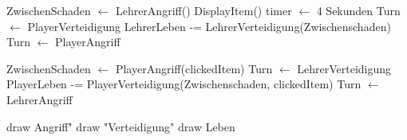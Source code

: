\begin{frame}
	\begin{algorithm}[H]
		\begin{algorithmic}[1]
				\State ZwischenSchaden $\gets$ LehrerAngriff()
					\State DisplayItem()
				\EndIf
				\State timer $\gets$ 4 Sekunden
				\State Turn $\gets$ PlayerVerteidigung
				\State LehrerLeben -= LehrerVerteidigung(Zwischenschaden)
				\State Turn $\gets$ PlayerAngriff
			\EndIf
		\end{algorithmic}
		\caption{LehrerObject.update() pseudocode}
		\label{alg:LehrerUpdate}
	\end{algorithm}
\end{frame}

\begin{frame}
	\begin{algorithm}[H]
		\begin{algorithmic}[1]
			\State ZwischenSchaden $\gets$ PlayerAngriff(clickedItem)
			\State Turn $\gets$ LehrerVerteidigung
			\State PlayerLeben -= PlayerVerteidigung(Zwischenschaden, clickedItem)
			\State Turn $\gets$ LehrerAngriff
			\EndIf
			\EndIf
		\end{algorithmic}
		\caption{PlayerObject.update() pseudocode}
		\label{alg:PlayerUpdate}
	\end{algorithm}
\end{frame}

\begin{frame}
	\begin{algorithm}[H]
		\begin{algorithmic}[1]
			\State draw \dq Angriff"
			\State draw "Verteidigung"
			\EndIf
			\State draw Leben
		\end{algorithmic}
		\caption{draw() pseudocode}
		\label{alg:Draw}
	\end{algorithm}
\end{frame}
